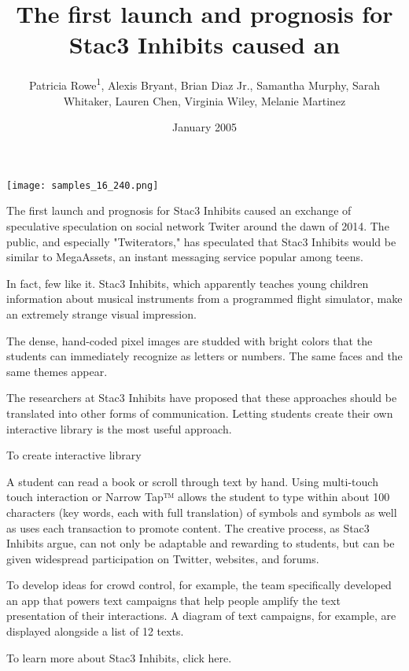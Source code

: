 \documentclass{article}
\title{The first launch and prognosis for Stac3 Inhibits caused an}
\author{Patricia Rowe\textsuperscript{1},  Alexis Bryant,  Brian Diaz Jr.,  Samantha Murphy,  Sarah Whitaker,  Lauren Chen,  Virginia Wiley,  Melanie Martinez}
\affil{\textsuperscript{1}Duke University}
\date{January 2005}
\begin{document}
\maketitle

\begin{center}
\begin{minipage}{0.75\linewidth}
\texttt{[image: samples\_16\_240.png]}
\end{minipage}
\end{center}

The first launch and prognosis for Stac3 Inhibits caused an exchange of speculative speculation on social network Twiter around the dawn of 2014. The public, and especially "Twiterators," has speculated that Stac3 Inhibits would be similar to MegaAssets, an instant messaging service popular among teens.

In fact, few like it. Stac3 Inhibits, which apparently teaches young children information about musical instruments from a programmed flight simulator, make an extremely strange visual impression.

The dense, hand-coded pixel images are studded with bright colors that the students can immediately recognize as letters or numbers. The same faces and the same themes appear.

The researchers at Stac3 Inhibits have proposed that these approaches should be translated into other forms of communication. Letting students create their own interactive library is the most useful approach.

To create interactive library

A student can read a book or scroll through text by hand. Using multi-touch touch interaction or Narrow Tap™ allows the student to type within about 100 characters (key words, each with full translation) of symbols and symbols as well as uses each transaction to promote content. The creative process, as Stac3 Inhibits argue, can not only be adaptable and rewarding to students, but can be given widespread participation on Twitter, websites, and forums.

To develop ideas for crowd control, for example, the team specifically developed an app that powers text campaigns that help people amplify the text presentation of their interactions. A diagram of text campaigns, for example, are displayed alongside a list of 12 texts.

To learn more about Stac3 Inhibits, click here.
\end{document}
